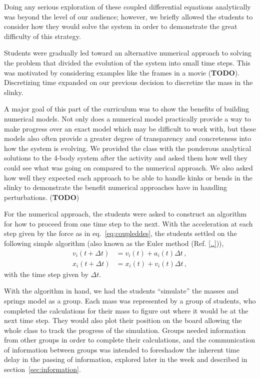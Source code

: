 \documentclass[prb,preprint]{revtex4-1}
\newcommand{\TODO}[1]{\marginpar{\raggedright\scriptsize\textbf{TODO:} #1} (\textbf{TODO})}
\newcommand{\eq}[1]{eq.~\eqref{eq:#1}}
\renewcommand{\sec}[1]{section~\ref{sec:#1}}
\newcommand{\nn}{\nonumber}
\begin{document}
Doing any serious exploration of these coupled differential equations
analytically was beyond the level of our audience; however, we briefly allowed
the students to consider how they would solve the system in order to demonstrate
the great difficulty of this strategy.

Students were gradually led toward an alternative numerical approach to solving
the problem that divided the evolution of the system into small time
steps. This was motivated by considering examples like the frames in a
movie\TODO{slow mo here and at the intro}. Discretizing time expanded on our previous decision to discretize the mass
in the slinky.

A major goal of this part of the curriculum was to show the benefits of building
numerical models. Not only does a numerical model
practically provide a way to make progress over an exact model which may be difficult
to work with, but these models also often provide a greater degree of transparency and
concreteness into how the system is evolving. We provided the class with the
ponderous analytical solutions to the 4-body system after the activity and asked
them how well they could see what was going on compared to the numerical
approach. We also asked how well they expected each approach to be able to
handle kinks or bends in the slinky to demonstrate the benefit numerical
approaches have in handling perturbations.\TODO{move below}

For the numerical approach, the students were asked to construct an algorithm
for how to proceed from one time step to the next. With the acceleration at each
step given by the force as in \eq{coupleddes}, the students settled on the
following simple algorithm (also known as the Euler method (Ref. \ref{..})),
\begin{align} \label{eq:algorithm}
v_i(t+\Delta t) &= v_i(t) + a_i(t)\Delta t
\,,\nn\\
x_i(t+\Delta t) &= x_i(t) + v_i(t)\Delta t
\,,\end{align}
with the time step given by $\Delta t$.

With the algorithm in hand, we had the students ``simulate'' the masses and
springs model as a group. Each mass was represented by a group of 
students, who completed the calculations for their mass to figure out where it would be
at the next time step.
They would also plot their position on the board allowing the whole class to track
the progress of the simulation.
Groups needed information from other groups in order to complete their calculations,
and the communication of information between groups was intended 
to foreshadow the inherent time delay in the passing of information, explored later in
the week and described in \sec{information}.
\end{document}
